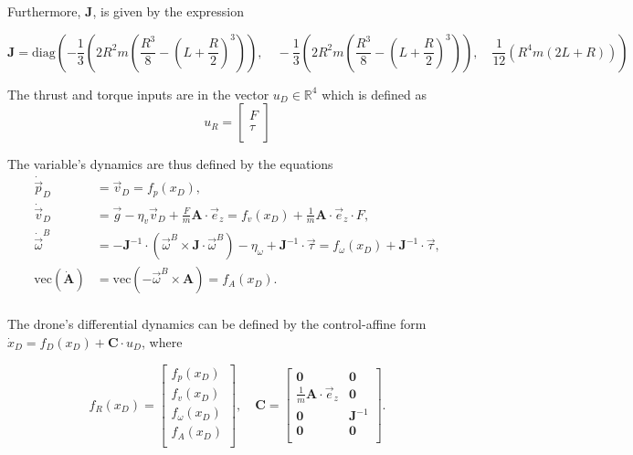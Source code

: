 Furthermore, $\mathbf{J}$, is given by the expression

\begin{equation*}
    \mathbf{J} = \text{diag}(-\frac{1}{3}(2R^2m(\frac{R^3}{8} - (L + \frac{R}{2})^3)), \quad
    -\frac{1}{3}(2R^2m(\frac{R^3}{8} - (L + \frac{R}{2})^3)), \quad
    \frac{1}{12}(R^4m(2L + R)))
\end{equation*}

The thrust and torque inputs are in the vector $u_D \in \mathbb{R}^4$ which is defined as
\begin{equation*}
    u_R = \begin{bmatrix}
        F \\
        \tau \\
    \end{bmatrix}
\end{equation*}

The variable's dynamics are thus defined by the equations
\begin{align*}
    \dot{\vec{p}}_{D} &= \vec{v}_{D} = f_p(x_D), \\
    \dot{\vec{v}}_{D} &=  \vec{g} - \eta_v \vec{v}_{D} + \frac{F}{m} \mathbf{A} \cdot \vec{e}_{z} = f_v(x_D) +\frac{1}{m} \mathbf{A} \cdot \vec{e}_{z} \cdot F, \\
    \dot{\vec{\omega}}^B &= -\mathbf{J}^{-1} \cdot (\vec{\omega}^B \times \mathbf{J} \cdot \vec{\omega}^B) - \eta_{\omega} + \mathbf{J}^{-1} \cdot \vec{\tau} = f_{\omega}(x_D)+\mathbf{J}^{-1} \cdot \vec{\tau}, \\
    \text{vec}(\dot{\mathbf{A}}) &= \text{vec}(-\vec{\omega}^B \times \mathbf{A}) = f_A(x_D). \\
\end{align*}

The drone's differential dynamics can be defined by the control-affine form $\dot{x}_{D} = f_D(x_D)+ \mathbf{C} \cdot u_D$, where

\begin{equation*}
    f_R(x_D) = \begin{bmatrix}
        f_p(x_D) \\
        f_v(x_D) \\
        f_{\omega}(x_D) \\
        f_A(x_D) \\
    \end{bmatrix}, \quad 
    \mathbf{C} = \begin{bmatrix}
        \mathbf{0} & \mathbf{0} \\
        \frac{1}{m} \mathbf{A} \cdot \vec{e}_{z} & \mathbf{0} \\
        \mathbf{0} & \mathbf{J}^{-1} \\
        \mathbf{0} & \mathbf{0} \\
    \end{bmatrix}.
\end{equation*}

